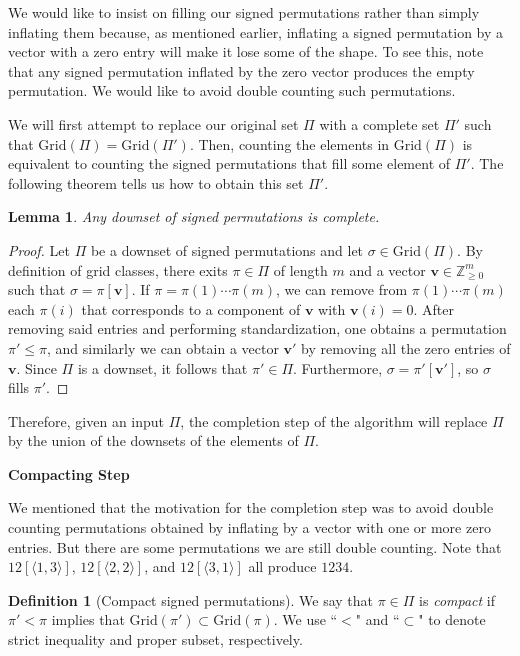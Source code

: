 \documentclass{article}
\numberwithin{equation}{section}
\newtheorem{lem}[thm]{Lemma}
\theoremstyle{definition}
\newtheorem{defn}{Definition}[section]
\newcommand{\V}{\textbf{v}}
\newcommand{\Grid}{\text{Grid}}
\begin{document}
We would like to insist on filling our signed permutations rather than simply inflating them because, as mentioned earlier, inflating a signed permutation by a vector with a zero entry will make it lose some of the shape.  To see this, note that any signed permutation inflated by the zero vector produces the empty permutation.  We would like to avoid double counting such permutations.

We will first attempt to replace our original set $\Pi$ with a complete set $\Pi'$ such that $\Grid(\Pi) = \Grid(\Pi')$.  Then, counting the elements in $\Grid(\Pi)$ is equivalent to counting the signed permutations that fill some element of $\Pi'$.  The following theorem tells us how to obtain this set $\Pi'$.

\begin{lem}
Any downset of signed permutations is complete.
\end{lem}
\begin{proof}
Let $\Pi$ be a downset of signed permutations and let $\sigma\in\Grid(\Pi).$ By definition of grid classes, there exits $\pi\in\Pi$ of length $m$ and a vector $\V\in\mathbb{Z}_{\geq0}^m$ such that $\sigma=\pi[\V]$. If $\pi=\pi(1)\cdots\pi(m)$, we can remove from $\pi(1)\cdots\pi(m)$ each $\pi(i)$ that corresponds to a component of $\V$ with $\V(i)=0$. After removing said entries and performing standardization, one obtains a permutation $\pi'\leq\pi$, and similarly we can obtain a vector $\V'$ by removing all the zero entries of $\V$. Since $\Pi$ is a downset, it follows that $\pi'\in\Pi$. Furthermore, $\sigma=\pi'[\V']$, so $\sigma$ fills $\pi'$.
\end{proof}

Therefore, given an input $\Pi$, the completion step of the algorithm will replace $\Pi$ by the union of the downsets of the elements of $\Pi$.



\vspace{5mm}
\noindent \textbf{\large Compacting Step}

We mentioned that the motivation for the completion step was to avoid double counting permutations obtained by inflating by a vector with one or more zero entries.  But there are some permutations we are still double counting.
Note that $12[\langle1,3\rangle]$, $12[\langle2,2\rangle]$, and $12[\langle3,1\rangle]$ all produce $1234$.

\begin{defn}[Compact signed permutations] We say that $\pi\in\Pi$ is \emph{compact} if $\pi'<\pi$ implies that $\Grid(\pi')\subset\Grid(\pi)$. We use ``$<$" and ``$\subset$" to denote strict inequality and proper subset, respectively. 
\end{defn}
\end{document}
